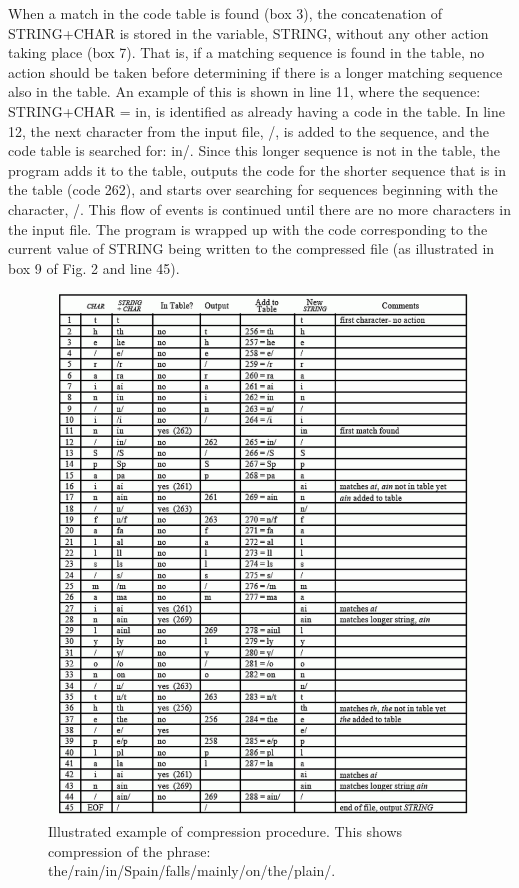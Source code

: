 \documentclass[12pt, a4paper]{article}
\begin{document}
When a match in the code table is found (box 3), the concatenation of STRING+CHAR is stored in the variable, STRING, without any other action taking place (box 7). That is, if a matching sequence is found in the table, no action should be taken before determining if there is a longer matching sequence also in the table. An example of this is shown in line 11, where the sequence: STRING+CHAR = in, is identified as already having a code in the table. In line 12, the next character from the input file, /, is added to the sequence, and the code table is searched for: in/. Since this longer sequence is not in the table, the program adds it to the table, outputs the code for the shorter sequence that is in the table (code 262), and starts over searching for sequences beginning with the character, /. This flow of events is continued until there are no more characters in the input file. The program is wrapped up with the code corresponding to the current value of STRING being written to the compressed file (as illustrated in box 9 of Fig. 2 and line 45).
\begin{figure}
    \centering
    \includegraphics{images/example.png}
    \caption{Illustrated example of compression procedure. This shows compression of the phrase: the/rain/in/Spain/falls/mainly/on/the/plain/.}
    \label{fig:enter-label}
\end{figure}
 \newpage
\end{document}
